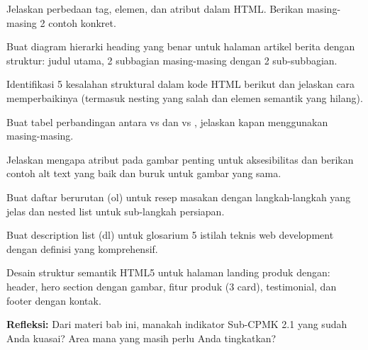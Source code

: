 \documentclass[../main.tex]{subfiles}
\begin{document}
\begin{latihan}
  \item Jelaskan perbedaan tag, elemen, dan atribut dalam HTML. Berikan masing-masing 2 contoh konkret.
  \item Buat diagram hierarki heading yang benar untuk halaman artikel berita dengan struktur: judul utama, 2 subbagian masing-masing dengan 2 sub-subbagian.
  \item Identifikasi 5 kesalahan struktural dalam kode HTML berikut dan jelaskan cara memperbaikinya (termasuk nesting yang salah dan elemen semantik yang hilang).
  \item Buat tabel perbandingan antara  vs  dan  vs , jelaskan kapan menggunakan masing-masing.
  \item Jelaskan mengapa atribut  pada gambar penting untuk aksesibilitas dan berikan contoh alt text yang baik dan buruk untuk gambar yang sama.
  \item Buat daftar berurutan (ol) untuk resep masakan dengan langkah-langkah yang jelas dan nested list untuk sub-langkah persiapan.
  \item Buat description list (dl) untuk glosarium 5 istilah teknis web development dengan definisi yang komprehensif.
  \item Desain struktur semantik HTML5 untuk halaman landing produk dengan: header, hero section dengan gambar, fitur produk (3 card), testimonial, dan footer dengan kontak.
  \item \textbf{Refleksi:} Dari materi bab ini, manakah indikator Sub-CPMK 2.1 yang sudah Anda kuasai? Area mana yang masih perlu Anda tingkatkan?
\end{latihan}
\end{document}
